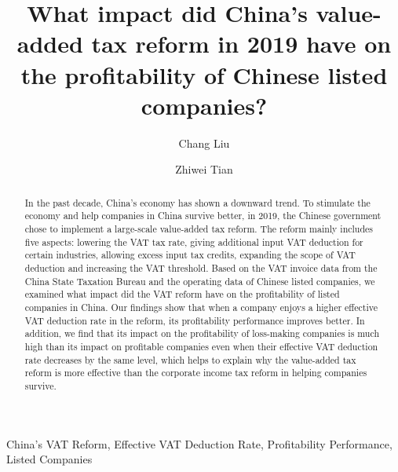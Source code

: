 \documentclass[3p,times]{elsarticle}
\begin{document}
\begin{frontmatter}


\author{Chang Liu}
\author{Zhiwei Tian}

\dochead{}

\title{What impact did China's value-added tax reform in 2019 have on the profitability of Chinese listed companies?}

\address[label1]{Shanghai university of finance and economics}

\begin{abstract}
In the past decade, China's economy has shown a downward trend. To stimulate the economy and help companies in China survive better, in 2019, the Chinese government chose to implement a large-scale value-added tax reform. The reform mainly includes five aspects: lowering the VAT tax rate, giving additional input VAT deduction for certain industries, allowing excess input tax credits, expanding the scope of VAT deduction and increasing the VAT threshold. Based on the VAT invoice data from the China State Taxation Bureau and the operating data of Chinese listed companies, we examined 
what impact did the VAT reform have on the profitability of listed companies in China. Our findings show that when a company enjoys a higher effective VAT deduction rate in the reform, its profitability performance improves better. In addition, we find that its impact on the profitability of loss-making companies is much high than its impact on profitable companies even when their effective VAT deduction rate decreases by the same level, which  helps to explain why the value-added tax reform is more effective than the corporate income tax reform in helping companies survive.
\end{abstract}

\begin{keyword}
China's VAT Reform, Effective VAT Deduction Rate, Profitability Performance, Listed Companies 
\end{keyword}

\end{frontmatter}
\end{document}

